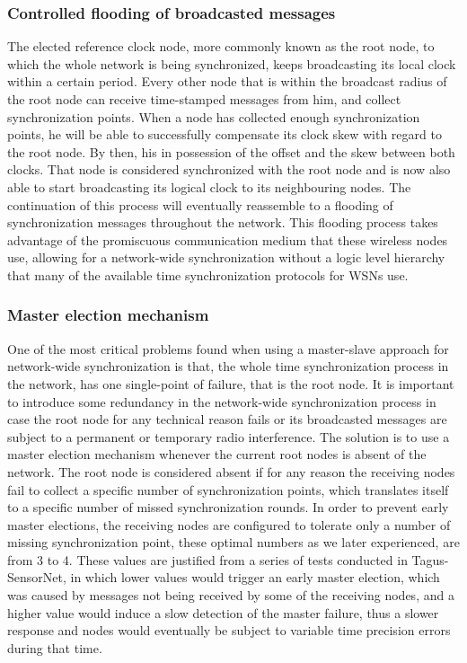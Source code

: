 \subsubsection{Controlled flooding of broadcasted messages}
The elected reference clock node, more commonly known as the root node, to which the whole network is being synchronized, keeps broadcasting its local clock within a certain period. Every other node that is within the broadcast radius of the root node can receive time-stamped messages from him, and collect synchronization points. When a node has collected enough synchronization points, he will be able to successfully compensate its clock skew with regard to the root node. By then, his in possession of the offset and the skew between both clocks. That node is considered synchronized with the root node and is now also able to start broadcasting its logical clock to its neighbouring nodes. The continuation of this process will eventually reassemble to a flooding of synchronization messages throughout the network. This flooding process takes advantage of the promiscuous communication medium that these wireless nodes use, allowing for a network-wide synchronization without a logic level hierarchy that many of the available time synchronization protocols for WSNs use.

\subsubsection{Master election mechanism}
One of the most critical problems found when using a master-slave approach for network-wide synchronization is that, the whole time synchronization process in the network, has one single-point of failure, that is the root node. It is important to introduce some redundancy in the network-wide synchronization process in case the root node for any technical reason fails or its broadcasted messages are subject to a permanent or temporary radio interference. The solution is to use a master election mechanism whenever the current root nodes is absent of the network. The root node is considered absent if for any reason the receiving nodes fail to collect a specific number of  synchronization points, which translates itself to a specific number of missed synchronization rounds. In order to prevent early master elections, the receiving nodes are configured to tolerate only a number of missing synchronization point, these optimal numbers as we later experienced, are from 3 to 4. These values are justified from a series of tests conducted in Tagus-SensorNet, in which lower values would trigger an early master election, which was caused by messages not being received by some of the receiving nodes, and a higher value would induce a slow detection of the master failure, thus a slower response and nodes would eventually be subject to variable time precision errors during that time.\\

